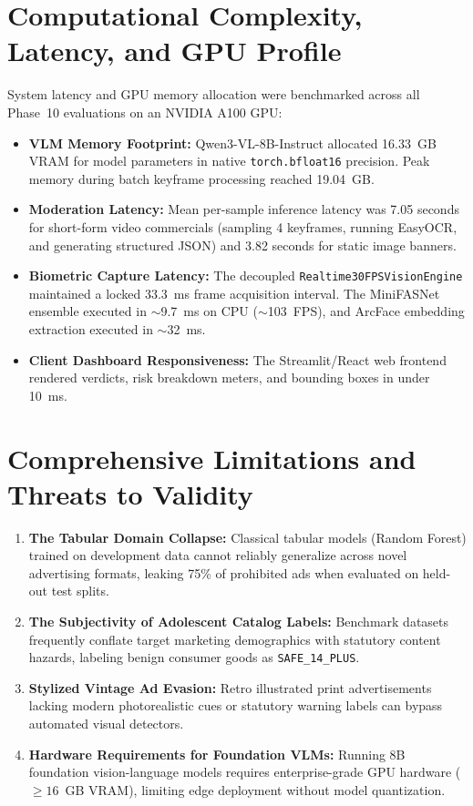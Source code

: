 \documentclass[12pt,a4paper]{report}
\begin{document}
\section{Computational Complexity, Latency, and GPU Profile}

System latency and GPU memory allocation were benchmarked across all Phase~10 evaluations on an NVIDIA A100 GPU:
\begin{itemize}
    \item \textbf{VLM Memory Footprint:} Qwen3-VL-8B-Instruct allocated 16.33~GB VRAM for model parameters in native \texttt{torch.bfloat16} precision. Peak memory during batch keyframe processing reached 19.04~GB.
    \item \textbf{Moderation Latency:} Mean per-sample inference latency was 7.05 seconds for short-form video commercials (sampling 4 keyframes, running EasyOCR, and generating structured JSON) and 3.82 seconds for static image banners.
    \item \textbf{Biometric Capture Latency:} The decoupled \texttt{Realtime30FPSVisionEngine} maintained a locked 33.3~ms frame acquisition interval. The MiniFASNet ensemble executed in $\sim$9.7~ms on CPU ($\sim$103~FPS), and ArcFace embedding extraction executed in $\sim$32~ms.
    \item \textbf{Client Dashboard Responsiveness:} The Streamlit/React web frontend rendered verdicts, risk breakdown meters, and bounding boxes in under 10~ms.
\end{itemize}

\section{Comprehensive Limitations and Threats to Validity}

\begin{enumerate}
    \item \textbf{The Tabular Domain Collapse:} Classical tabular models (Random Forest) trained on development data cannot reliably generalize across novel advertising formats, leaking 75\% of prohibited ads when evaluated on held-out test splits.
    \item \textbf{The Subjectivity of Adolescent Catalog Labels:} Benchmark datasets frequently conflate target marketing demographics with statutory content hazards, labeling benign consumer goods as \texttt{SAFE\_14\_PLUS}.
    \item \textbf{Stylized Vintage Ad Evasion:} Retro illustrated print advertisements lacking modern photorealistic cues or statutory warning labels can bypass automated visual detectors.
    \item \textbf{Hardware Requirements for Foundation VLMs:} Running 8B foundation vision-language models requires enterprise-grade GPU hardware ($\ge 16$~GB VRAM), limiting edge deployment without model quantization.
\end{enumerate}
\end{document}
